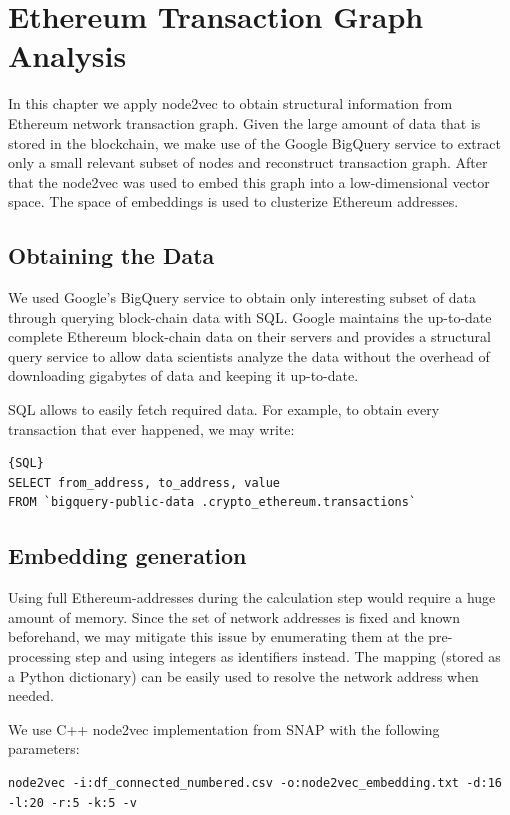 \chapter{Ethereum Transaction Graph Analysis}\label{chap:3}

In this chapter we apply node2vec to obtain structural information from Ethereum network transaction graph. Given the large amount of data that is stored in the blockchain, we make use of the Google BigQuery service to extract only a small relevant subset of nodes and reconstruct transaction graph. After that the node2vec was used to embed this graph into a low-dimensional vector space. The space of embeddings is used to clusterize Ethereum addresses.

\section{Obtaining the Data}
We used Google's BigQuery service to obtain only interesting subset of data through querying block-chain data with SQL. Google maintains the up-to-date complete Ethereum block-chain data on their servers and provides a structural query service to allow data scientists analyze the data without the overhead of downloading gigabytes of data and keeping it up-to-date. 

SQL allows to easily fetch required data. For example, to obtain every transaction that ever happened, we may write:


\begin{lstlisting}{SQL}
SELECT from_address, to_address, value
FROM `bigquery-public-data .crypto_ethereum.transactions`
\end{lstlisting}

\section{Embedding generation}

Using full Ethereum-addresses during the calculation step would require a huge amount of memory. Since the set of network addresses is fixed and known beforehand, we may mitigate this issue by enumerating them at the pre-processing step and using integers as identifiers instead. The mapping (stored as a Python dictionary) can be easily used to resolve the network address when needed.

We use C++ node2vec implementation from SNAP\cite{leskovec2016snap} with the following parameters:

\begin{lstlisting}
node2vec -i:df_connected_numbered.csv -o:node2vec_embedding.txt -d:16 -l:20 -r:5 -k:5 -v
\end{lstlisting}

